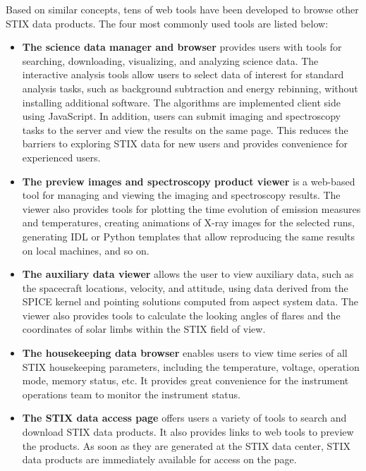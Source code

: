 \documentclass[referee]{preaa} %
\begin{document}
Based on similar concepts, tens of web tools have been developed to browse other STIX data products. The four most commonly used tools are listed below: 
\begin{itemize}
  \item  {\bf The science data manager and browser} provides users with tools for searching, downloading, visualizing, and analyzing science data. The interactive analysis tools allow users to select data of interest for standard analysis tasks, such as background subtraction and energy rebinning,  without installing additional software. 
  The algorithms are implemented client side using JavaScript. In addition, users can submit imaging and spectroscopy tasks to the server and view the results on the same page. This reduces the barriers to exploring STIX data for new users and provides convenience for experienced users.

  \item  {\bf The preview images and spectroscopy product viewer} is a web-based tool for managing and viewing the imaging and spectroscopy results. The viewer also provides tools for plotting the time evolution of emission measures and temperatures,  creating animations of X-ray images for the selected runs, generating IDL or Python templates that allow reproducing the same results on local machines, and so on. 
  \item {\bf The auxiliary data viewer} allows the user to view auxiliary data, such as the spacecraft locations, velocity, and attitude, using data derived from the SPICE kernel and  pointing solutions computed from aspect system data.
  The viewer also provides tools to calculate the looking angles of flares and the coordinates of solar limbs within the STIX field of view.
  \item  {\bf The housekeeping data browser} enables users to view time series of all STIX housekeeping parameters, including the temperature, voltage, operation mode, memory status, etc. It provides great convenience for the instrument operations team to monitor the instrument status. 
\item {\bf The STIX data access page} offers users a variety of tools to search and download STIX data products. 
It also provides links to web tools to preview the products. As soon as they are generated at the STIX data center, STIX data products are immediately available for access on the page.
\end{itemize}
\end{document}
